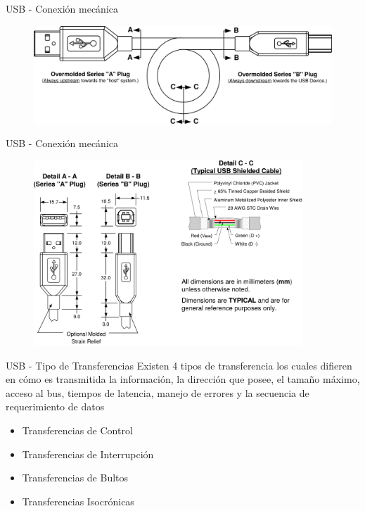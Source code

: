 \documentclass[11pt,a4paper]{beamer}
\begin{document}
			\begin{frame}{USB - Conexión mecánica}
				\begin{figure}
					\includegraphics[width=.9\textwidth]{usbcableb.png}
				\end{figure}
			\end{frame}
			\begin{frame}{USB - Conexión mecánica}
				\begin{figure}
					\includegraphics[width=0.9\textwidth]{usbcablea.png}
				\end{figure}
			\end{frame}
			\begin{frame}{USB - Tipo de Transferencias}
					Existen 4 tipos de transferencia los cuales difieren en cómo es transmitida la información, la dirección que posee, el tamaño máximo, acceso al bus, tiempos de latencia, manejo de errores y la secuencia de requerimiento de datos
				\begin{itemize}
					\item Transferencias de Control
					\item Transferencias de Interrupción
					\item Transferencias de Bultos
					\item Transferencias Isocrónicas
				\end{itemize}
			\end{frame}
\end{document}
